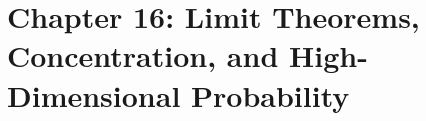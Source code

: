\section{Chapter 16: Limit Theorems, Concentration, and High-Dimensional Probability}
\label{ch:limit-theorems-concentration-high-dimensional-probability}

